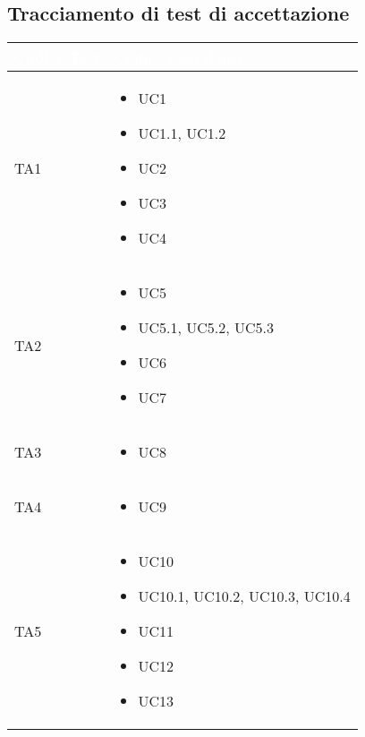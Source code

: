 \newpage

\subsection{Tracciamento di test di accettazione}

{
    \setlength{\freewidth}{\dimexpr\textwidth-10\tabcolsep}
    \renewcommand{\arraystretch}{1.5}
    \centering
    \setlength{\aboverulesep}{0pt}
    \setlength{\belowrulesep}{0pt}
    \begin{longtable}{C{.27\freewidth} C{.45\freewidth}}
       \toprule
    \textcolor{white}{\textbf{Codice Test}}&
    \textcolor{white}{\textbf{Codice caso d'uso}}\\
    \toprule
    \endhead

    TA1 & \begin{itemize}
        \item UC1
        \item UC1.1, UC1.2
        \item UC2
        \item UC3
        \item UC4
    \end{itemize} \\

    
    TA2 & \begin{itemize}
        \item UC5
        \item UC5.1, UC5.2, UC5.3
        \item UC6
        \item UC7
    \end{itemize} \\

    
    TA3 & \begin{itemize}
        \item UC8
    \end{itemize} \\

    
    TA4 & \begin{itemize}
        \item UC9
    \end{itemize} \\

    
    TA5 & \begin{itemize}
        \item UC10
        \item UC10.1, UC10.2, UC10.3, UC10.4
        \item UC11
        \item UC12
        \item UC13
    \end{itemize} \\


\end{longtable}}
